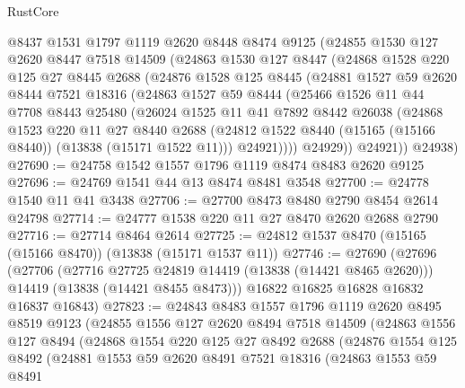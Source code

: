 \begin{lexlean}{RustCore}
\begin{coremodule}
    @8437
    @1531
    @1797
    @1119
    @2620
    @8448
    @8474
    @9125
    (@24855
      @1530
      @127
      @2620
      @8447
      @7518
      @14509
      (@24863
        @1530
        @127
        @8447
        (@24868
          @1528
          @220
          @125
          @27
          @8445
          @2688
          (@24876
            @1528
            @125
            @8445
            (@24881
              @1527
              @59
              @2620
              @8444
              @7521
              @18316
              (@24863
                @1527
                @59
                @8444
                (@25466
                  @1526
                  @11
                  @44
                  @7708
                  @8443
                  @25480
                  (@26024
                    @1525
                    @11
                    @41
                    @7892
                    @8442
                    @26038
                    (@24868
                      @1523
                      @220
                      @11
                      @27
                      @8440
                      @2688
                      (@24812 @1522 @8440 (@15165 (@15166 @8440)) (@13838 (@15171 @1522 @11)))
                      @24921))))
              @24929))
          @24921))
      @24938)
@27690 := @24758 @1542 @1557 @1796 @1119 @8474 @8483 @2620 @9125
@27696 := @24769 @1541 @44 @13 @8474 @8481 @3548
@27700 := @24778 @1540 @11 @41 @3438
@27706 := @27700 @8473 @8480 @2790 @8454 @2614 @24798
@27714 := @24777 @1538 @220 @11 @27 @8470 @2620 @2688 @2790
@27716 := @27714 @8464 @2614
@27725 := @24812 @1537 @8470 (@15165 (@15166 @8470)) (@13838 (@15171 @1537 @11))
@27746 := @27690
    (@27696
      (@27706
        (@27716 @27725 @24819 @14419 (@13838 (@14421 @8465 @2620)))
        @14419
        (@13838 (@14421 @8455 @8473)))
      @16822
      @16825
      @16828
      @16832
      @16837
      @16843)
@27823 := @24843
    @8483
    @1557
    @1796
    @1119
    @2620
    @8495
    @8519
    @9123
    (@24855
      @1556
      @127
      @2620
      @8494
      @7518
      @14509
      (@24863
        @1556
        @127
        @8494
        (@24868
          @1554
          @220
          @125
          @27
          @8492
          @2688
          (@24876
            @1554
            @125
            @8492
            (@24881
              @1553
              @59
              @2620
              @8491
              @7521
              @18316
              (@24863
                @1553
                @59
                @8491

\end{coremodule}
\end{lexlean}
